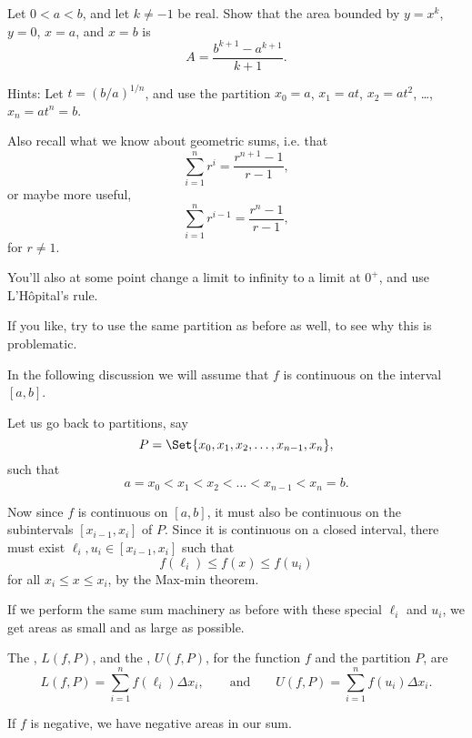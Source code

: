 \begin{exercise}
	Let $0 < a < b$, and let $k \neq -1$ be real.
	Show that the area bounded by $y = x^k$, $y = 0$, $x = a$, and $x = b$ is
	\[
		A = \frac{b^{k + 1} - a^{k + 1}}{k + 1}.
	\]

	\noindent
	Hints: Let $t = (b/a)^{1/n}$, and use the partition $x_0 = a$, $x_1 = a t$, $x_2 = a t^2$, \ldots, $x_n = a t^n = b$.

	Also recall what we know about geometric sums, i.e. that
	\[
		\sum_{i = 1}^n r^i = \frac{r^{n + 1} - 1}{r - 1},
	\]
	or maybe more useful,
	\[
		\sum_{i = 1}^n r^{i - 1} = \frac{r^n - 1}{r - 1},
	\]
	for $r \neq 1$.

	You'll also at some point change a limit to infinity to a limit at $0^+$, and use L'H\^{o}pital's rule.

	If you like, try to use the same partition as before as well, to see why this is problematic.
\end{exercise}


In the following discussion we will assume that $f$ is continuous on the interval $[a, b]$.

Let us go back to partitions, say
\[
	P = \Set{x_0, x_1, x_2, \ldots, x_{n - 1}, x_n},
\]
such that
\[
	a = x_0 < x_1 < x_2 < \ldots < x_{n - 1} < x_n = b.
\]

\noindent
Now since $f$ is continuous on $[a, b]$, it must also be continuous on the subintervals $[x_{i - 1}, x_i]$ of $P$.
Since it is continuous on a closed interval, there must exist $\ell_i, u_i \in [x_{i - 1}, x_i]$ such that
\[
	f(\ell_i) \leq f(x) \leq f(u_i)
\]
for all $x_i \leq x \leq x_i$, by the Max-min theorem.

If we perform the same sum machinery as before with these special $\ell_i$ and $u_i$, we get areas as small and as large as possible.

\begin{definition}
	The , $L(f, P)$, and the , $U(f, P)$, for the function $f$ and the partition $P$, are
	\[
		L(f, P) = \sum_{i = 1}^n f(\ell_i) \Delta x_i, \qquad \text{and} \qquad U(f, P) = \sum_{i = 1}^n f(u_i) \Delta x_i.
	\]
\end{definition}

\begin{remark}
	If $f$ is negative, we have negative areas in our sum.
\end{remark}

